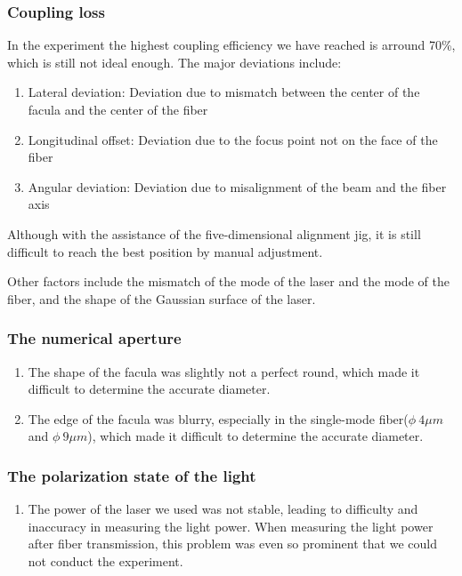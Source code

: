 \documentclass[10pt,a4paper,twocolumn,twoside,UTF8]{article}
\begin{document}
	\subsubsection{Coupling loss}
	In the experiment the highest coupling efficiency we have reached is arround 70\%, which is still not ideal enough. The major deviations include:
	\begin{enumerate}[label=\arabic*.]
		\item Lateral deviation: Deviation due to mismatch between the center of the facula and the center of the fiber
		\item Longitudinal offset: Deviation due to the focus point not on the face of the fiber
		\item Angular deviation: Deviation due to misalignment of the beam and the fiber axis
	\end{enumerate}
	Although with the assistance of the five-dimensional alignment jig, it is still difficult to reach the best position by manual adjustment.
	
	Other factors include the mismatch of the mode of the laser and the mode of the fiber, and the shape of the Gaussian surface of the laser.
	\subsubsection{The numerical aperture}
	\begin{enumerate}[label=\arabic*.]
		\item The shape of the facula was slightly not a perfect round, which made it difficult to determine the accurate diameter.
		\item The edge of the facula was blurry, especially in the single-mode fiber($\phi \ 4\mu m$  and $\phi \ 9\mu m$), which made it difficult to determine the accurate diameter.
	\end{enumerate}
	\subsubsection{The polarization state of the light}
	\begin{enumerate}[label=\arabic*.]
		\item The power of the laser we used was not stable, leading to difficulty and inaccuracy in measuring the light power. When measuring the light power after fiber transmission, this problem was even so prominent that we could not conduct the experiment.
	\end{enumerate}
	
\end{document}
